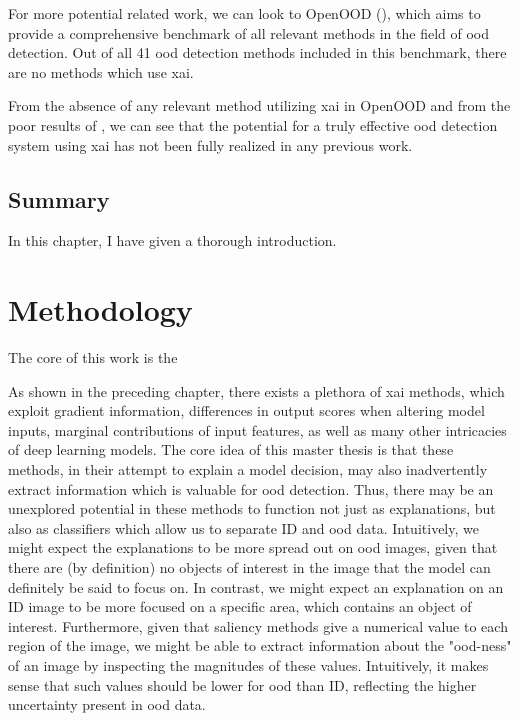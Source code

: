 \documentclass[UKenglish]{uiomasterthesis} %
\theoremstyle{definition}
\begin{document}
For more potential related work, we can look to OpenOOD (\cite{openood}), which aims to provide a comprehensive benchmark of all relevant methods in the field of \ac{ood} detection. Out of all 41 \ac{ood} detection methods included in this benchmark, there are no methods which use \ac{xai}.

From the absence of any relevant method utilizing \ac{xai} in OpenOOD and from the poor results of \cite{martinez}, we can see that the potential for a truly effective \ac{ood} detection system using \ac{xai} has not been fully realized in any previous work.

\section{Summary}

In this chapter, I have given a thorough introduction.

\chapter{Methodology}

The core of this work is the 

As shown in the preceding chapter, there exists a plethora of \ac{xai} methods, which exploit gradient information, differences in output scores when altering model inputs, marginal contributions of input features, as well as many other intricacies of deep learning models. The core idea of this master thesis is that these methods, in their attempt to explain a model decision, may also inadvertently extract information which is valuable for \ac{ood} detection. Thus, there may be an unexplored potential in these methods to function not just as explanations, but also as classifiers which allow us to separate ID and \ac{ood} data. Intuitively, we might expect the explanations to be more spread out on \ac{ood} images, given that there are (by definition) no objects of interest in the image that the model can definitely be said to focus on. In contrast, we might expect an explanation on an ID image to be more focused on a specific area, which contains an object of interest. Furthermore, given that saliency methods give a numerical value to each region of the image, we might be able to extract information about the "\ac{ood}-ness" of an image by inspecting the magnitudes of these values. Intuitively, it makes sense that such values should be lower for \ac{ood} than ID, reflecting the higher uncertainty present in \ac{ood} data.
\end{document}
